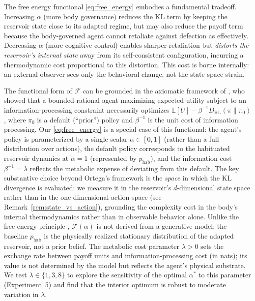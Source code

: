 \documentclass[11pt,a4paper]{article}
\theoremstyle{definition}
\newcommand{\E}{\mathbb{E}}
\newcommand{\KL}{D_{\mathrm{KL}}}
\newcommand{\FE}{\mathcal{F}}
\begin{document}
The free energy functional \eqref{eq:free_energy} embodies a fundamental
tradeoff.  Increasing $\alpha$ (more body governance) reduces the KL term
by keeping the reservoir state close to its adapted regime, but may also
reduce the payoff term because the body-governed agent cannot retaliate
against defection as effectively.
Decreasing $\alpha$ (more cognitive control) enables sharper retaliation
but \emph{distorts the reservoir's internal state} away from its
self-consistent configuration, incurring a thermodynamic cost proportional
to this distortion.  This cost is borne internally: an external observer
sees only the behavioral change, not the state-space strain.

The functional form of $\FE$ can be grounded in the axiomatic framework
of \citet{ortega2013}, who showed that a bounded-rational agent maximizing
expected utility subject to an information-processing constraint
necessarily optimizes
$\E[U] - \beta^{-1} \KL(\pi \| \pi_0)$,
where $\pi_0$ is a default (``prior'') policy and $\beta^{-1}$ is the
unit cost of information processing.
Our \eqref{eq:free_energy} is a special case of this functional: the
agent's policy is parameterized by a single scalar $\alpha \in [0,1]$
(rather than a full distribution over actions), the default policy
corresponds to the habituated reservoir dynamics at $\alpha = 1$
(represented by $p_{\mathrm{hab}}$), and the information cost
$\beta^{-1} = \lambda$ reflects the metabolic expense of deviating
from this default.
The key substantive choice beyond Ortega's framework is the
\emph{space} in which the KL divergence is evaluated: we measure it
in the reservoir's $d$-dimensional state space rather than in the
one-dimensional action space (see Remark~\ref{rem:state_vs_action}),
grounding the complexity cost in the body's internal thermodynamics
rather than in observable behavior alone.
Unlike the free energy principle \citep{friston2006}, $\FE(\alpha)$
is not derived from a generative model; the baseline $p_{\mathrm{hab}}$
is the physically realized stationary distribution of the adapted
reservoir, not a prior belief.
The metabolic cost parameter $\lambda > 0$ sets the exchange rate between
payoff units and information-processing cost (in nats); its value is not
determined by the model but reflects the agent's physical substrate.
We test $\lambda \in \{1, 3, 8\}$ to explore the sensitivity of the
optimal $\alpha^{*}$ to this parameter (Experiment~5) and find that the
interior optimum is robust to moderate variation in $\lambda$.
\end{document}
